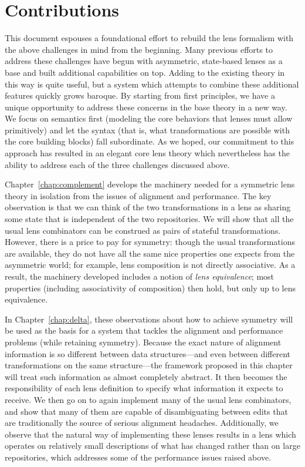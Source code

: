 \section{Contributions}
\label{sec:intro-contributions}
This document espouses a foundational effort to rebuild the lens formalism
with the above challenges in mind from the beginning. Many previous efforts
to address these challenges have begun with asymmetric, state-based lenses
as a base and built additional capabilities on top. Adding to the existing
theory in this way is quite useful, but a system which attempts to combine
these additional features quickly grows baroque. By starting from first
principles, we have a unique opportunity to address these concerns in the
base theory in a new way. We focus on semantics first (modeling the core
behaviors that lenses must allow primitively) and let the syntax (that is,
what transformations are possible with the core building blocks) fall
subordinate. As we hoped, our commitment to this approach has resulted in an
elegant core lens theory which nevertheless has the ability to address each
of the three challenges discussed above.

Chapter~\ref{chap:complement} develops the machinery needed for a symmetric
lens theory in isolation from the issues of alignment and performance. The
key observation is that we can think of the two transformations in a lens as
sharing some state that is independent of the two repositories. We will show
that all the usual lens combinators can be construed as pairs of stateful
transformations. However, there is a price to pay for symmetry: though the
usual transformations are available, they do not have all the same nice
properties one expects from the asymmetric world; for example, lens
composition is not directly associative. As a result, the machinery
developed includes a notion of \emph{lens equivalence}; most properties
(including associativity of composition) then hold, but only up to lens
equivalence.

In Chapter~\ref{chap:delta}, these observations about how to achieve
symmetry will be used as the basis for a system that tackles the alignment
and performance problems (while retaining symmetry). Because the exact
nature of alignment information is so different between data
structures---and even between different transformations on the same
structure---the framework proposed in this chapter will treat such
information as almost completely abstract. It then becomes the
responsibility of each lens definition to specify what information it
expects to receive. We then go on to again implement many of the usual lens
combinators, and show that many of them are capable of disambiguating
between edits that are traditionally the source of serious alignment
headaches. Additionally, we observe that the natural way of implementing
these lenses results in a lens which operates on relatively small
descriptions of what has changed rather than on large repositories, which
addresses some of the performance issues raised above.

